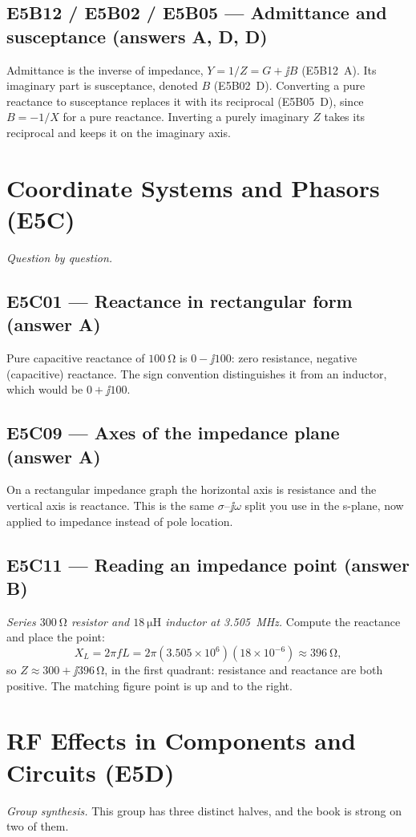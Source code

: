 \subsection*{E5B12 / E5B02 / E5B05 --- Admittance and susceptance (answers A, D, D)}
Admittance is the inverse of impedance, \(Y=1/Z=G+\jj B\) (E5B12~A). Its imaginary
part is susceptance, denoted \(B\) (E5B02~D). Converting a pure reactance to
susceptance replaces it with its reciprocal (E5B05~D), since \(B=-1/X\) for a pure
reactance. Inverting a purely imaginary \(Z\) takes its reciprocal and keeps it on
the imaginary axis.

\section{Coordinate Systems and Phasors (E5C)}
\emph{Question by question.}

\subsection*{E5C01 --- Reactance in rectangular form (answer A)}
Pure capacitive reactance of \(\SI{100}{\ohm}\) is \(0-\jj100\): zero resistance,
negative (capacitive) reactance. The sign convention distinguishes it from an
inductor, which would be \(0+\jj100\).

\subsection*{E5C09 --- Axes of the impedance plane (answer A)}
On a rectangular impedance graph the horizontal axis is resistance and the
vertical axis is reactance. This is the same \(\sigma\)--\(\jj\omega\) split you
use in the s-plane, now applied to impedance instead of pole location.

\subsection*{E5C11 --- Reading an impedance point (answer B)}
\emph{Series \(\SI{300}{\ohm}\) resistor and \(\SI{18}{\micro\henry}\) inductor at
\SI{3.505}{\mega\hertz}.} Compute the reactance and place the point:
\[
X_L=2\pi f L=2\pi(3.505\times10^6)(18\times10^{-6})\approx\SI{396}{\ohm},
\]
so \(Z\approx300+\jj396\,\si{\ohm}\), in the first quadrant: resistance and
reactance are both positive. The matching figure point is up and to the right.

\section{RF Effects in Components and Circuits (E5D)}
\emph{Group synthesis.}
This group has three distinct halves, and the book is strong on two of them.

